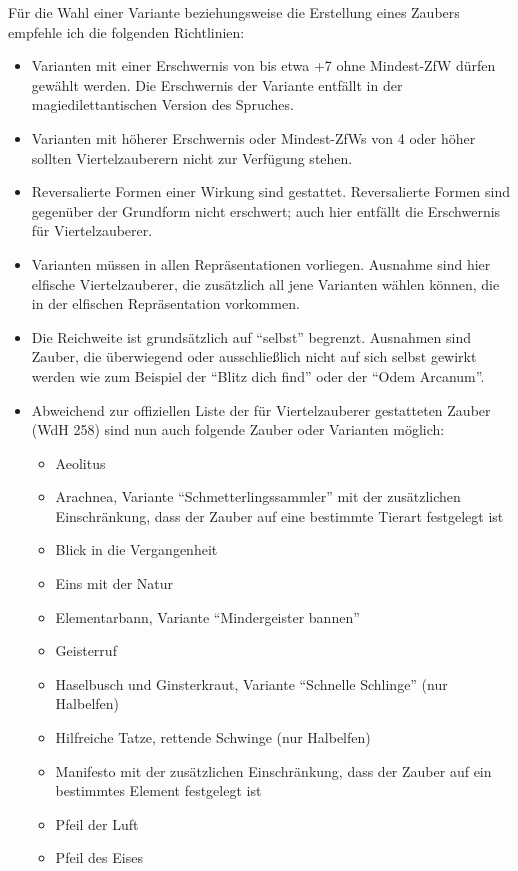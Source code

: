 Für die Wahl einer Variante beziehungsweise die Erstellung eines Zaubers empfehle ich die folgenden Richtlinien:
\begin{itemize}
	\item Varianten mit einer Erschwernis von bis etwa +7 ohne Mindest-ZfW dürfen gewählt werden. Die Erschwernis der Variante entfällt in der magiedilettantischen Version des Spruches.
	\item Varianten mit höherer Erschwernis oder Mindest-ZfWs von 4 oder höher sollten Viertelzauberern nicht zur Verfügung stehen.
	\item Reversalierte Formen einer Wirkung sind gestattet. Reversalierte Formen sind gegenüber der Grundform nicht erschwert; auch hier entfällt die Erschwernis für Viertelzauberer.
	\item Varianten müssen in allen Repräsentationen vorliegen. Ausnahme sind hier elfische Viertelzauberer, die zusätzlich all jene Varianten wählen können, die in der elfischen Repräsentation vorkommen.
	\item Die Reichweite ist grundsätzlich auf \enquote{selbst} begrenzt. Ausnahmen sind Zauber, die überwiegend oder ausschließlich nicht auf sich selbst gewirkt werden wie zum Beispiel der \enquote{Blitz dich find} oder der \enquote{Odem Arcanum}.
	\item Abweichend zur offiziellen Liste der für Viertelzauberer gestatteten Zauber (WdH 258) sind nun auch folgende Zauber oder Varianten möglich:
\begin{itemize}
	\item Aeolitus
	\item Arachnea, Variante \enquote{Schmetterlingssammler} mit der zusätzlichen Einschränkung, dass der Zauber auf eine bestimmte Tierart festgelegt ist
	\item Blick in die Vergangenheit
	\item Eins mit der Natur
	\item Elementarbann, Variante \enquote{Mindergeister bannen}
	\item Geisterruf
	\item Haselbusch und Ginsterkraut, Variante \enquote{Schnelle Schlinge} (nur Halbelfen)
	\item Hilfreiche Tatze, rettende Schwinge (nur Halbelfen)
	\item Manifesto mit der zusätzlichen Einschränkung, dass der Zauber auf ein bestimmtes Element festgelegt ist
	\item Pfeil der Luft
	\item Pfeil des Eises

\end{itemize}
\end{itemize}
